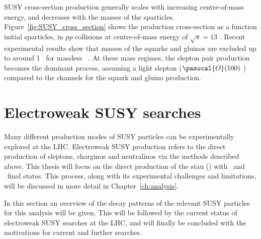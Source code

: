 	\ac{SUSY} cross-section production generally scales with increasing centre-of-mass energy, and decreases with the masses  of the sparticles.
	Figure~\ref{fig:SUSY_cross_section} shows the production cross-section as a function initial sparticles, in $pp$ collisions at centre-of-mass energy of $\sqrt{s}=13$ \tev.
	Recent experimental results show that masses of the squarks and gluinos are excluded up to around 1 \tev\ for massless \ninoone ~\cite{PhysRevD.97.112001,gluino13tev}. At these mass regimes, the slepton pair production becomes the dominant process, assuming a light slepton ($\pazocal{O}(100)$ \gev) compared to the channels for the squark and gluino production.
	\SUSYcrosssection
		
	\section{Electroweak SUSY searches} \label{sec:EWKSUSY}
	Many different production modes of \ac{SUSY} particles can be experimentally explored at the \ac{LHC}. Electroweak \ac{SUSY} production refers to the direct production of sleptons, charginos and neutralinos via the methods described above. 
	This thesis will focus on the direct production of the stau (\stau) with \ltau\ and \ninoone\ final states. 
	This process, along with its experimental challenges and limitations, will be discussed in more detail in Chapter~\ref{ch:analysis}.
	
	In this section an overview of the decay patterns of the relevant \ac{SUSY} particles for this analysis will be given. 
	This will be followed by the current status of electroweak \ac{SUSY} searches at the \ac{LHC}, and will finally be concluded with the motivations for current and further searches.
